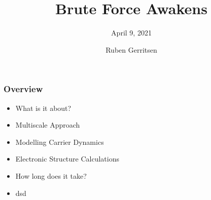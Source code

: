 \documentclass[t,aspectratio=169, 8pt]{beamer}
\title{Brute Force Awakens}
\subtitle{April 9, 2021}
\author{Ruben Gerritsen}
\begin{document}
\begin{titleframe}[variant=1,bgimage=background.png]
\end{titleframe}

\begin{frame}[fragile]
	\frametitle{Overview}
	\begin{itemize}
		\item What is it about?
		\item Multiscale Approach
		\item Modelling Carrier Dynamics
		\item Electronic Structure Calculations
		\item How long does it take?
		\item dsd
	\end{itemize}
\end{frame}
\end{document}

